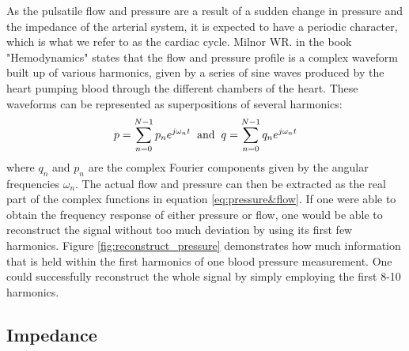As the pulsatile flow and pressure are a result of a sudden change in pressure and the impedance of the arterial system, it is expected to have a periodic character, which is what we refer to as the cardiac cycle. Milnor WR. in the book "Hemodynamics" \cite{RN15} states that the flow and pressure profile is a complex waveform built up of various harmonics, given by a series of sine waves produced by the heart pumping blood through the different chambers of the heart. These waveforms can be represented as superpositions of several harmonics:
\begin{equation}
    p = \sum_{n=0}^{N-1}p_ne^{j\omega_nt} 
    \hspace{0.2cm}\textrm{and}\hspace{0.2cm}
    q = \sum_{n=0}^{N-1}q_ne^{j\omega_nt} 
    \label{eq:pressure&flow}
\end{equation}
where $q_n$ and $p_n$ are the complex Fourier components given by the angular frequencies $\omega_n$. The actual flow and pressure can then be extracted as the real part of the complex functions in equation \ref{eq:pressure&flow}. If one were able to obtain the frequency response of either pressure or flow, one would be able to reconstruct the signal without too much deviation by using its first few harmonics. Figure \ref{fig:reconstruct_pressure} demonstrates how much information that is held within the first harmonics of one blood pressure measurement. One could successfully reconstruct the whole signal by simply employing the first 8-10 harmonics.


\subsection{Impedance}\label{sect:impedance}

